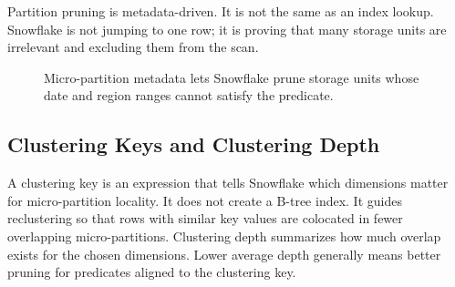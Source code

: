 \begin{notebox}
Partition pruning is metadata-driven. It is not the same as an index lookup. Snowflake is not jumping to one row; it is proving that many storage units are irrelevant and excluding them from the scan.
\end{notebox}

\begin{figure}[H]
    \centering
    \caption{Micro-partition metadata lets Snowflake prune storage units whose date and region ranges cannot satisfy the predicate.}
    \label{fig:chapter1-micro-partition-pruning}
\end{figure}

\subsection{Clustering Keys and Clustering Depth}
A clustering key is an expression that tells Snowflake which dimensions matter for micro-partition locality. It does not create a B-tree index. It guides reclustering so that rows with similar key values are colocated in fewer overlapping micro-partitions. Clustering depth summarizes how much overlap exists for the chosen dimensions. Lower average depth generally means better pruning for predicates aligned to the clustering key.

